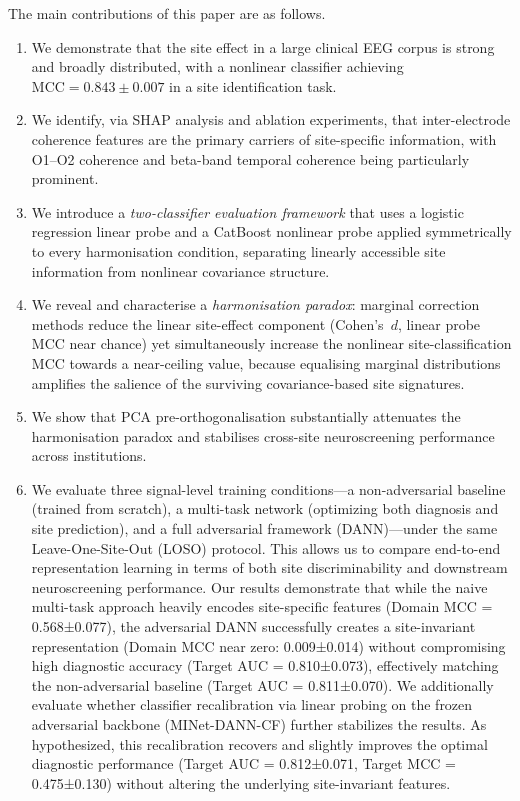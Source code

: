 \documentclass[preprint,12pt]{elsarticle}
\begin{document}
The main contributions of this paper are as follows.
\begin{enumerate}
  \item We demonstrate that the site effect in a large clinical EEG
        corpus is strong and broadly distributed, with a nonlinear
        classifier achieving $\mathrm{MCC} = 0.843 \pm 0.007$ in a
        site identification task.
  \item We identify, via SHAP analysis and ablation experiments, that
        inter-electrode coherence features are the primary carriers of
        site-specific information, with O1--O2 coherence and beta-band
        temporal coherence being particularly prominent.
  \item We introduce a \emph{two-classifier evaluation framework}
        that uses a logistic regression linear probe and a CatBoost
        nonlinear probe applied symmetrically to every harmonisation
        condition, separating linearly accessible site information
        from nonlinear covariance structure.
  \item We reveal and characterise a \emph{harmonisation paradox}:
        marginal correction methods reduce the linear site-effect
        component (Cohen's~$d$, linear probe MCC near chance) yet
        simultaneously increase the nonlinear site-classification
        MCC towards a near-ceiling value, because equalising marginal
        distributions amplifies the salience of the surviving
        covariance-based site signatures.
  \item We show that PCA pre-orthogonalisation substantially
        attenuates the harmonisation paradox and stabilises
        cross-site neuroscreening performance across institutions.
  \item We evaluate three signal-level training conditions—a non-adversarial baseline (trained from scratch), a multi-task network (optimizing both diagnosis and site prediction), and a full adversarial framework (DANN)—under the same Leave-One-Site-Out (LOSO) protocol. This allows us to compare end-to-end representation learning in terms of both site discriminability and downstream neuroscreening performance. Our results demonstrate that while the naive multi-task approach heavily encodes site-specific features (Domain MCC = 0.568±0.077), the adversarial DANN successfully creates a site-invariant representation (Domain MCC near zero: 0.009±0.014) without compromising high diagnostic accuracy (Target AUC = 0.810±0.073), effectively matching the non-adversarial baseline (Target AUC = 0.811±0.070). We additionally evaluate whether classifier recalibration via linear probing on the frozen adversarial backbone (MINet-DANN-CF) further stabilizes the results. As hypothesized, this recalibration recovers and slightly improves the optimal diagnostic performance (Target AUC = 0.812±0.071, Target MCC = 0.475±0.130) without altering the underlying site-invariant features.
\end{enumerate}
\end{document}
